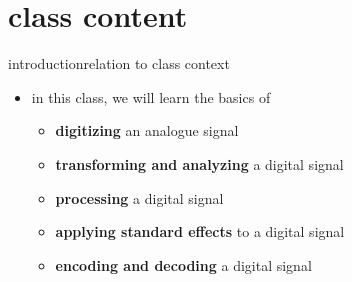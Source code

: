 \section{class content}
\begin{frame}{introduction}{relation to class context}
	\begin{itemize}
		\item	in this class, we will learn the basics of
            \begin{itemize}
                \item   \textbf{digitizing} an analogue signal
                \smallskip
                \item   \textbf{transforming and analyzing} a digital signal
                \smallskip
                \item   \textbf{processing} a digital signal
                \smallskip
                \item   \textbf{applying standard effects} to a digital signal
                \smallskip
                \item   \textbf{encoding and decoding} a digital signal
            \end{itemize}
	\end{itemize}
\end{frame}




